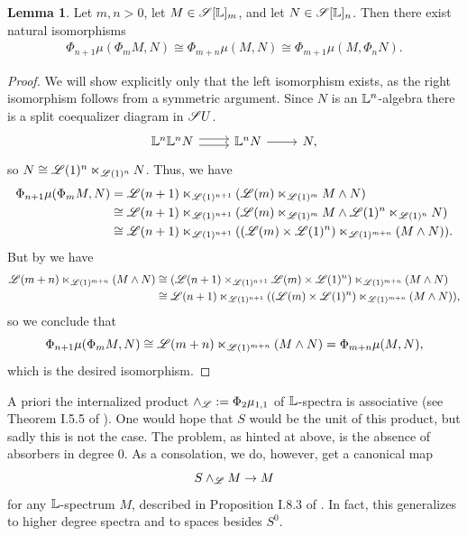 \documentclass[openany, amssymb, psamsfonts]{amsart}
\theoremstyle{definition}
\newtheorem{lem}{Lemma}[section]
\numberwithin{equation}{section}
\begin{document}
\begin{lem} \label{lem:higher_absorbers}
    Let $m, n > 0$, let $M \in \mathscr{S}[\mathbb{L}]_m$, and let $N \in \mathscr{S}[\mathbb{L}]_n$. Then there exist natural isomorphisms
    \begin{align*}
        \Phi_{n + 1}\mu(\Phi_m M, N) \cong \Phi_{m + n}\mu(M, N) \cong \Phi_{m + 1}\mu(M, \Phi_n N).
    \end{align*}
\end{lem}
\begin{proof}
    We will show explicitly only that the left isomorphism exists, as the right isomorphism follows from a symmetric argument. Since $N$ is an $\mathbb{L}^n$-algebra there is a split coequalizer diagram in $\mathscr{S} U$.
\begin{equation*}
    \begin{tikzcd}
        \LL^n \LL^n N \ar[r, shift right = 0.25em] \ar[r, shift left = 0.25em] & \LL^n N \ar[r] & N,
    \end{tikzcd}
\end{equation*} so $N \cong \mathscr{L}(1)^n \ltimes_{\mathscr{L}(1)^n} N$. Thus, we have
\begin{align*}
    \Phi_{n + 1}\mu(\Phi_m M, N) &= \mathscr{L}(n + 1) \ltimes_{\mathscr{L}(1)^{n + 1}} (\mathscr{L}(m) \ltimes_{\mathscr{L}(1)^m} M \wedge N)\\
    &\cong \mathscr{L}(n + 1) \ltimes_{\mathscr{L}(1)^{n + 1}} (\mathscr{L}(m) \ltimes_{\mathscr{L}(1)^m} M \wedge \mathscr{L}(1)^n \ltimes_{\mathscr{L}(1)^n} N)\\
    &\cong \mathscr{L}(n + 1) \ltimes_{\mathscr{L}(1)^{n + 1}} ((\mathscr{L}(m) \times \mathscr{L}(1)^n) \ltimes_{\mathscr{L}(1)^{m + n}} (M \wedge N)).
\end{align*} But by  we have
\begin{align*}
    \mathscr{L}(m + n) \ltimes_{\mathscr{L}(1)^{m + n}} (M \wedge N) &\cong (\mathscr{L}(n + 1) \times_{\mathscr{L}(1)^{n + 1}} \mathscr{L}(m) \times \mathscr{L}(1)^n) \ltimes_{\mathscr{L}(1)^{m + n}} (M \wedge N)\\
    &\cong \mathscr{L}(n + 1) \ltimes_{\mathscr{L}(1)^{n + 1}} ((\mathscr{L}(m) \times \mathscr{L}(1)^n)\ltimes_{\mathscr{L}(1)^{m + n}} (M \wedge N)),
\end{align*} so we conclude that
\begin{equation*}
    \Phi_{n + 1}\mu(\Phi_m M, N) \cong \mathscr{L}(m + n) \ltimes_{\mathscr{L}(1)^{m + n}} (M \wedge N) = \Phi_{m + n}\mu(M, N),
\end{equation*} which is the desired isomorphism.
\end{proof}

A priori the internalized product $\wedge_{\mathscr{L}} := \Phi_2\mu_{1, 1}$ of $\mathbb{L}$-spectra is associative (see Theorem I.5.5 of \cite{EKMM}). One would hope that $S$ would be the unit of this product, but sadly this is not the case. The problem, as hinted at above, is the absence of absorbers in degree 0. As a consolation, we do, however, get a canonical map
\begin{equation*}
    S \wedge_{\mathscr{L}} M \to M
\end{equation*} for any $\mathbb{L}$-spectrum $M$, described in Proposition I.8.3 of \cite{EKMM}. In fact, this generalizes to higher degree spectra and to spaces besides $S^0$.
\end{document}

